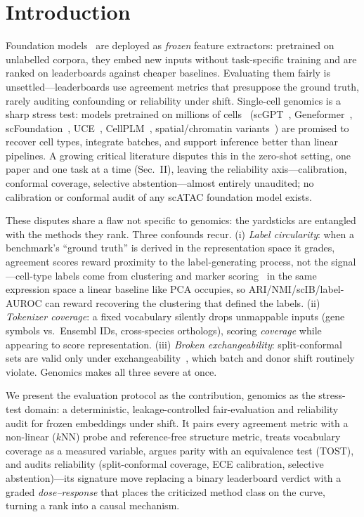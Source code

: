 \documentclass[journal]{IEEEtran}
\begin{document}
\section{Introduction}
Foundation models~\cite{vaswani2017,bommasani2021} are deployed as \emph{frozen} feature extractors: pretrained on unlabelled corpora, they embed new inputs without task-specific training and are ranked on leaderboards against cheaper baselines. Evaluating them fairly is unsettled---leaderboards use agreement metrics that presuppose the ground truth, rarely auditing confounding or reliability under shift. Single-cell genomics is a sharp stress test: models pretrained on millions of cells~\cite{regev2017hca,tabulasapiens2022} (scGPT~\cite{scgpt2024}, Geneformer~\cite{geneformer2023}, scFoundation~\cite{scfoundation2024}, UCE~\cite{uce2023}, CellPLM~\cite{cellplm2024}, spatial/chromatin variants~\cite{nicheformer2025,chromfound2025,atacformer2024}) are promised to recover cell types, integrate batches, and support inference better than linear pipelines. A growing critical literature disputes this in the zero-shot setting, one paper and one task at a time (Sec.~II), leaving the reliability axis---calibration, conformal coverage, selective abstention---almost entirely unaudited; no calibration or conformal audit of any scATAC foundation model exists.

These disputes share a flaw not specific to genomics: the yardsticks are entangled with the methods they rank. Three confounds recur. (i) \emph{Label circularity}: when a benchmark's ``ground truth'' is derived in the representation space it grades, agreement scores reward proximity to the label-generating process, not the signal---cell-type labels come from clustering and marker scoring~\cite{wolf2018scanpy} in the same expression space a linear baseline like PCA occupies, so ARI/NMI/scIB/label-AUROC can reward recovering the clustering that defined the labels. (ii) \emph{Tokenizer coverage}: a fixed vocabulary silently drops unmappable inputs (gene symbols vs.\ Ensembl IDs, cross-species orthologs), scoring \emph{coverage} while appearing to score representation. (iii) \emph{Broken exchangeability}: split-conformal sets are valid only under exchangeability~\cite{barber2023}, which batch and donor shift routinely violate. Genomics makes all three severe at once.

We present the evaluation protocol as the contribution, genomics as the stress-test domain: a deterministic, leakage-controlled fair-evaluation and reliability audit for frozen embeddings under shift. It pairs every agreement metric with a non-linear ($k$NN) probe and reference-free structure metric, treats vocabulary coverage as a measured variable, argues parity with an equivalence test (TOST), and audits reliability (split-conformal coverage, ECE calibration, selective abstention)---its signature move replacing a binary leaderboard verdict with a graded \emph{dose--response} that places the criticized method class on the curve, turning a rank into a causal mechanism.
\end{document}
